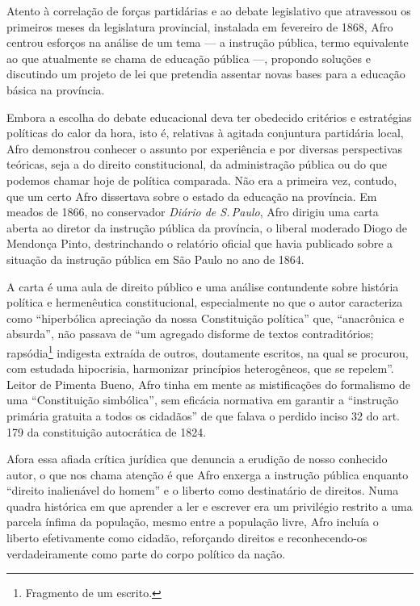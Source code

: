 Atento à correlação de forças partidárias e ao debate legislativo que
atravessou os primeiros meses da legislatura provincial, instalada em
fevereiro de 1868, Afro centrou esforços na análise de um tema ---
a instrução pública, termo equivalente ao que atualmente se chama de
educação pública ---, propondo soluções e discutindo um projeto de lei
que pretendia assentar novas bases para a educação básica na província.

Embora a escolha do debate educacional deva ter obedecido critérios e
estratégias políticas do calor da hora, isto é, relativas à agitada
conjuntura partidária local, Afro demonstrou conhecer o assunto
por experiência e por diversas perspectivas teóricas, seja a do direito
constitucional, da administração pública ou do que podemos chamar hoje
de política comparada. Não era a primeira vez, contudo, que um certo
Afro dissertava sobre o estado da educação na província. Em
meados de 1866, no conservador \emph{Diário de S.\,Paulo}, Afro
dirigiu uma carta aberta ao diretor da instrução pública da província, o
liberal moderado Diogo de Mendonça Pinto, destrinchando o relatório
oficial que havia publicado sobre a situação da instrução pública em São
Paulo no ano de 1864.

A carta é uma aula de direito público e uma análise contundente sobre
história política e hermenêutica constitucional, especialmente no que o
autor caracteriza como ``hiperbólica apreciação da nossa Constituição
política'' que, ``anacrônica e absurda'', não passava de ``um agregado
disforme de textos contraditórios; rapsódia\footnote{Fragmento de um
  escrito.} indigesta extraída de outros, doutamente escritos, na qual
se procurou, com estudada hipocrisia, harmonizar princípios
heterogêneos, que se repelem''. Leitor de Pimenta Bueno, Afro
tinha em mente as mistificações do formalismo de uma ``Constituição
simbólica'', sem eficácia normativa em garantir a ``instrução primária
gratuita a todos os cidadãos'' de que falava o perdido inciso 32 do art.
179 da constituição autocrática de 1824.

Afora essa afiada crítica jurídica que denuncia a erudição de nosso
conhecido autor, o que nos chama atenção é que Afro enxerga a
instrução pública enquanto ``direito inalienável do homem'' e o liberto
como destinatário de direitos. Numa quadra histórica em que aprender a
ler e escrever era um privilégio restrito a uma parcela ínfima da
população, mesmo entre a população livre, Afro incluía o liberto
efetivamente como cidadão, reforçando direitos e reconhecendo-os
verdadeiramente como parte do corpo político da nação.

